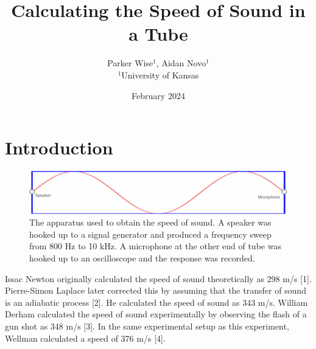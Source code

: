 \documentclass[a4paper, 12pt, twocolumn]{article}
\begin{document}
\title{Calculating the Speed of Sound in a Tube}
\author{Parker Wise$^{1}$, Aidan Novo$^{1}$\\$^{1}$University of Kansas}
\date{February 2024}

\section{Introduction}
\begin{figure}[h]
	\centering
	\includegraphics[scale=1]{box.pdf}
	\caption{The apparatus used to obtain the speed of sound. A speaker was hooked up to a signal generator and produced a frequency sweep from 800 Hz to 10 kHz. A microphone at the other end of tube was hooked up to an oscilloscope and the response was recorded.}
	\label{fig:box}
\end{figure}
Issac Newton originally calculated the speed of sound theoretically as 298 m/s [1]. Pierre-Simon Laplace later corrected this by assuming that the transfer of sound is an adiabatic process [2]. He calculated the speed of sound as 343 m/s. William Derham calculated the speed of sound experimentally by observing the flash of a gun shot as 348 m/s [3]. In the same experimental setup as this experiment, Wellman calculated a speed of 376 m/s [4]. 
\end{document}
